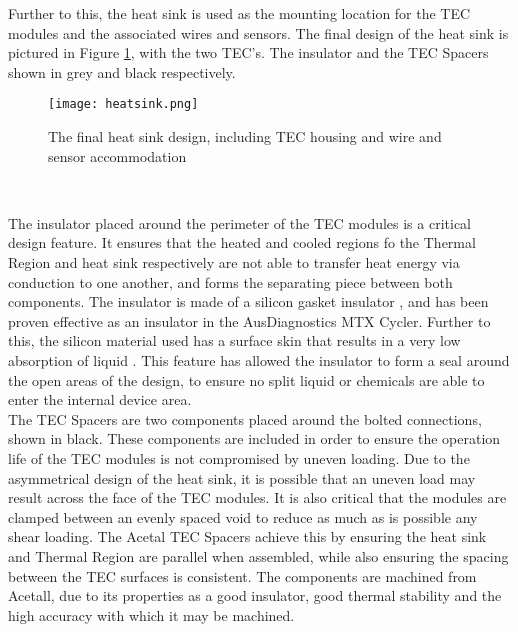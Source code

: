 Further to this, the heat sink is used as the mounting location for the TEC modules and the associated wires and sensors. The final design of the heat sink is pictured in Figure \ref{fig:heatsink}, with the two TEC's. The insulator and the TEC Spacers shown in grey and black respectively.

\begin{figure}[!htb]
	\centering
	\texttt{[image: heatsink.png]}
	\caption[Heat sink final design.]{The final heat sink design, including TEC housing and wire and sensor accommodation}
	\label{fig:heatsink}
\end{figure} 
\FloatBarrier

The insulator placed around the perimeter of the TEC modules is a critical design feature. It ensures that the heated and cooled regions fo the Thermal Region and heat sink respectively are not able to transfer heat energy via conduction to one another, and forms the separating piece between both components. The insulator is made of a silicon gasket insulator \cite{jehbco}, and has been proven effective as an insulator in the AusDiagnostics MTX Cycler. Further to this, the silicon material used has a surface skin that results in a very low absorption of liquid \cite{jehbco}. This feature has allowed the insulator to form a seal around the open areas of the design, to ensure no split liquid or chemicals are able to enter the internal device area.\\

The TEC Spacers are two components placed around the bolted connections, shown in black. These components are included in order to ensure the operation life of the TEC modules is not compromised by uneven loading. Due to the asymmetrical design of the heat sink, it is possible that an uneven load may result across the face of the TEC modules. It is also critical that the modules are clamped between an evenly spaced void to reduce as much as is possible any shear loading. The Acetal TEC Spacers achieve this by ensuring the heat sink and Thermal Region are parallel when assembled, while also ensuring the spacing between the TEC surfaces is consistent. The components are machined from Acetall, due to its properties as a good insulator, good thermal stability and the high accuracy with which it may be machined.

